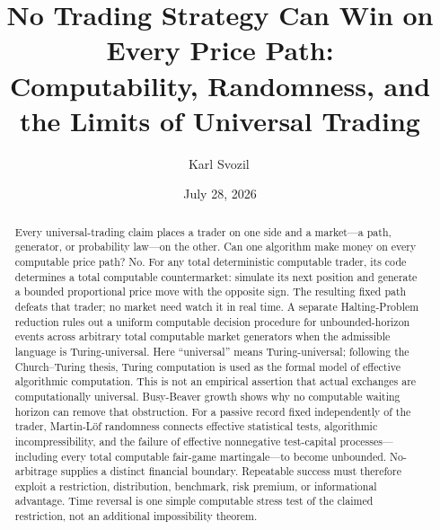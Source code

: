 \documentclass[aps,pra,reprint,superscriptaddress,amsmath,amssymb,floatfix]{revtex4-2}
\theoremstyle{plain}
\theoremstyle{definition}
\theoremstyle{remark}
\begin{document}
\title{No Trading Strategy Can Win on Every Price Path:\\
Computability, Randomness, and the Limits of Universal Trading}

\author{Karl Svozil\,}

\date{July 28, 2026}

\begin{abstract}
Every universal-trading claim places a trader on one side and a market---a
path, generator, or probability law---on the other. Can one algorithm make
money on every computable price path? No. For any total deterministic
computable trader, its code determines a total computable countermarket:
simulate its next position and generate a bounded proportional price move with
the opposite sign. The resulting fixed path defeats that trader; no market
need watch it in real time.
A separate Halting-Problem reduction rules out a uniform computable decision
procedure for unbounded-horizon events across arbitrary total computable market
generators when the admissible language is Turing-universal. Here
``universal'' means Turing-universal; following the Church--Turing thesis,
Turing computation is used as the formal model of effective algorithmic
computation. This is not an empirical assertion that actual exchanges are
computationally universal. Busy-Beaver growth shows why no computable waiting
horizon can remove that obstruction.
For a passive record fixed independently of the trader, Martin-L\"of
randomness connects effective statistical tests, algorithmic incompressibility,
and the failure of effective nonnegative test-capital processes---including
every total computable fair-game martingale---to become unbounded. No-arbitrage
supplies a distinct financial boundary.
Repeatable success must therefore exploit a restriction, distribution,
benchmark, risk premium, or informational advantage. Time reversal is one
simple computable stress test of the claimed restriction, not an additional
impossibility theorem.
\end{abstract}

\maketitle

\end{document}

